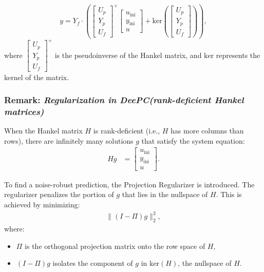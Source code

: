 \documentclass[12pt, a4paper]{article}
\begin{document}
\[
y = Y_f \cdot \left(
\begin{bmatrix} U_p \\ Y_p \\ U_f \end{bmatrix}^+
\begin{bmatrix}
u_{\text{ini}} \\
y_{\text{ini}} \\
u
\end{bmatrix} + \text{ker} \left( \begin{bmatrix} U_p \\ Y_p \\ U_f \end{bmatrix} \right) \right),
\]
where \( \begin{bmatrix} U_p \\ Y_p \\ U_f \end{bmatrix}^+  \) is the pseudoinverse of the Hankel matrix, and \( \text{ker} \) represents the kernel of the matrix.


\subsubsection{Remark: \textit{Regularization in DeePC(rank-deficient Hankel matrices)}}

When the Hankel matrix \( H \) is rank-deficient (i.e., \( H \) has more columns than rows), there are infinitely many solutions \( g \) that satisfy the system equation:
\begin{align}
    H g &= 
    \begin{bmatrix}
        u_{\text{ini}} \\
        y_{\text{ini}} \\
        u
    \end{bmatrix}.
\end{align}

\noindent To find a noise-robust prediction, the Projection Regularizer is introduced. The regularizer penalizes the portion of \( g \) that lies in the nullspace of \( H \). This is achieved by minimizing:
\begin{align}
    \| (I - \Pi) g \|_2^2,
\end{align}
where:
\begin{itemize}
    \item \( \Pi \) is the orthogonal projection matrix onto the row space of \( H \),
    \item \( (I - \Pi) g \) isolates the component of \( g \) in \( \text{ker}(H) \), the nullspace of \( H \).
\end{itemize}
\end{document}

